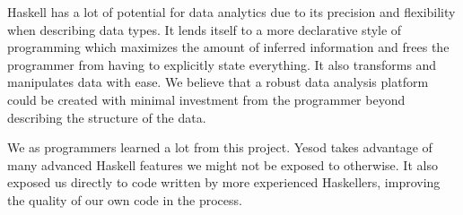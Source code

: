 \documentclass[letterpaper,twocolumn,9pt]{article}
\begin{document}
Haskell has a lot of potential for data analytics due to its precision and flexibility when describing data types.  It lends itself to a more declarative style of programming which maximizes the amount of inferred information and frees the programmer from having to explicitly state everything.  It also transforms and manipulates data with ease.  We believe that a robust data analysis platform could be created with minimal investment from the programmer beyond describing the structure of the data.

We as programmers learned a lot from this project. Yesod takes advantage of many advanced Haskell features we might not be exposed to otherwise.  It also exposed us directly to code written by more experienced Haskellers, improving the quality of our own code in the process.

{\footnotesize 
}
\end{document}
